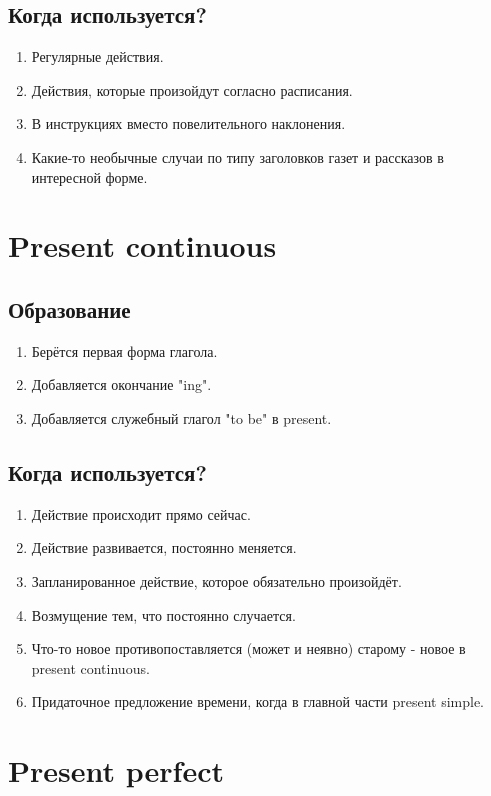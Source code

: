 \documentclass[oneside]{book}
\begin{document}
	\subsection{Когда используется?}
	\begin{enumerate}
		\item Регулярные действия.
		\item Действия, которые произойдут согласно расписания.
		\item В инструкциях вместо повелительного наклонения.
		\item Какие-то необычные случаи по типу заголовков газет и рассказов в интересной форме.
	\end{enumerate}

	\section{Present continuous}
	\subsection{Образование}
	\begin{enumerate}
		\item Берётся первая форма глагола.
		\item Добавляется окончание "ing".
		\item Добавляется служебный глагол "to be" в present.
	\end{enumerate}

	\subsection{Когда используется?}
	\begin{enumerate}
		\item Действие происходит прямо сейчас.
		\item Действие развивается, постоянно меняется.
		\item Запланированное действие, которое обязательно произойдёт.
		\item Возмущение тем, что постоянно случается.
		\item Что-то новое противопоставляется (может и неявно) старому - новое в present continuous.
		\item Придаточное предложение времени, когда в главной части present simple.
	\end{enumerate}

	\section{Present perfect}
\end{document}
